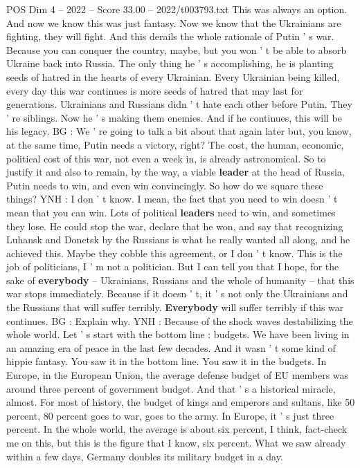 \begin{textsample}{POS Dim 4 – 2022 – Score 33.00 – 2022/t003793.txt}
This was always an option.
And now we know this was just fantasy.
Now we know that the Ukrainians are fighting, they will fight.
And this derails the whole rationale of Putin ' s war.
Because you can conquer the country, maybe, but you won ' t be able to absorb Ukraine back into Russia.
The only thing he ' s accomplishing, he is planting seeds of hatred in the hearts of every Ukrainian.
Every Ukrainian being killed, every day this war continues is more seeds of hatred that may last for generations.
Ukrainians and Russians didn ' t hate each other before Putin.
They ' re siblings.
Now he ' s making them enemies.
And if he continues, this will be his legacy.
BG : We ' re going to talk a bit about that again later but, you know, at the same time, Putin needs a victory, right?
The cost, the human, economic, political cost of this war, not even a week in, is already astronomical.
So to justify it and also to remain, by the way, a viable \textbf{leader} at the head of Russia, Putin needs to win, and even win convincingly.
So how do we square these things?
YNH : I don ' t know.
I mean, the fact that you need to win doesn ' t mean that you can win.
Lots of political \textbf{leaders} need to win, and sometimes they lose.
He could stop the war, declare that he won, and say that recognizing Luhansk and Donetsk by the Russians is what he really wanted all along, and he achieved this.
Maybe they cobble this agreement, or I don ' t know.
This is the job of politicians, I ' m not a politician.
But I can tell you that I hope, for the sake of \textbf{everybody} -- Ukrainians, Russians and the whole of humanity -- that this war stops immediately.
Because if it doesn ' t, it ' s not only the Ukrainians and the Russians that will suffer terribly. \textbf{Everybody} will suffer terribly if this war continues.
BG : Explain why.
YNH : Because of the shock waves destabilizing the whole world.
Let ' s start with the bottom line : budgets.
We have been living in an amazing era of peace in the last few decades.
And it wasn ' t some kind of hippie fantasy.
You saw it in the bottom line.
You saw it in the budgets.
In Europe, in the European Union, the average defense budget of EU members was around three percent of government budget.
And that ' s a historical miracle, almost.
For most of history, the budget of kings and emperors and sultans, like 50 percent, 80 percent goes to war, goes to the army.
In Europe, it ' s just three percent.
In the whole world, the average is about six percent, I think, fact-check me on this, but this is the figure that I know, six percent.
What we saw already within a few days, Germany doubles its military budget in a day.

\end{textsample}
